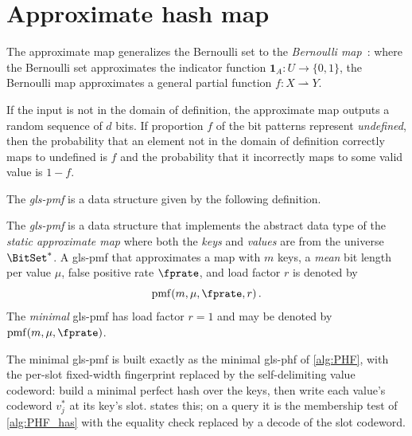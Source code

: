 \documentclass[ ../main.tex]{subfiles}
\begin{document}
\section{Approximate hash map}
\label{sec:pmf}
The approximate map generalizes the Bernoulli set to the \emph{Bernoulli map}~\cite{bmaps}: where the Bernoulli set approximates the indicator function $\mathbf{1}_A \colon U \to \{0,1\}$, the Bernoulli map approximates a general partial function $f \colon X \rightharpoonup Y$.

If the input is not in the domain of definition, the approximate map outputs a random sequence of $d$ bits. If proportion $f$ of the bit patterns represent \emph{undefined}, then the probability that an element not in the domain of definition correctly maps to undefined is $f$ and the probability that it incorrectly maps to some valid value is $1-f$.



The \emph{\gls{gls-pmf}} is a data structure given by the following definition.
\begin{definition}
The \emph{\gls{gls-pmf}} is a data structure that implements the abstract data type of the \emph{static approximate map} where both the \emph{keys} and \emph{values} are from the universe $\BitSet^*$.
A \gls{gls-pmf} that approximates a map with $m$ keys, a \emph{mean} bit length per value $\mu$, false positive rate $\fprate$, and load factor $r$ is denoted by
\begin{equation}
    \pmapf(m, \mu, \fprate, r)\,.
\end{equation}
The \emph{minimal} \gls{gls-pmf} has load factor $r=1$ and may be denoted by $\pmapf(m,\mu,\fprate)$.
\end{definition}

The minimal \gls{gls-pmf} is built exactly as the minimal \gls{gls-phf} of
\cref{alg:PHF}, with the per-slot fixed-width fingerprint replaced by the
self-delimiting value codeword: build a minimal perfect hash over the keys, then
write each value's codeword $v_j^*$ at its key's slot.  states
this; on a query it is the membership test of \cref{alg:PHF_has} with the equality
check replaced by a decode of the slot codeword.
\end{document}
